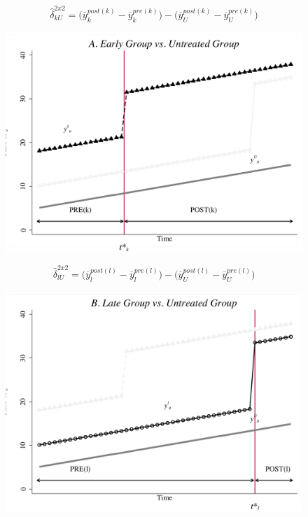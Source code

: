 \documentclass{beamer}
\begin{document}



\begin{frame}[plain]
$$\widehat{\delta}^{2x2}_{kU} = \bigg ( \overline{y}_k^{post(k)} - \overline{y}_k^{pre(k)} \bigg ) - \bigg ( \overline{y}_U^{post(k)} - \overline{y}_U^{pre(k)} \bigg ) $$
	\begin{figure}
	\includegraphics[scale=0.45]{./lecture_includes/bacon_goodman_3.png}
	\end{figure}

\end{frame}

\begin{frame}[plain]
$$\widehat{\delta}^{2x2}_{lU} = \bigg ( \overline{y}_l^{post(l)} - \overline{y}_l^{pre(l)} \bigg ) - \bigg ( \overline{y}_U^{post(l)} - \overline{y}_U^{pre(l)} \bigg ) $$
	\begin{figure}
	\includegraphics[scale=0.45]{./lecture_includes/bacon_goodman_4.png}
	\end{figure}

\end{frame}
\end{document}
